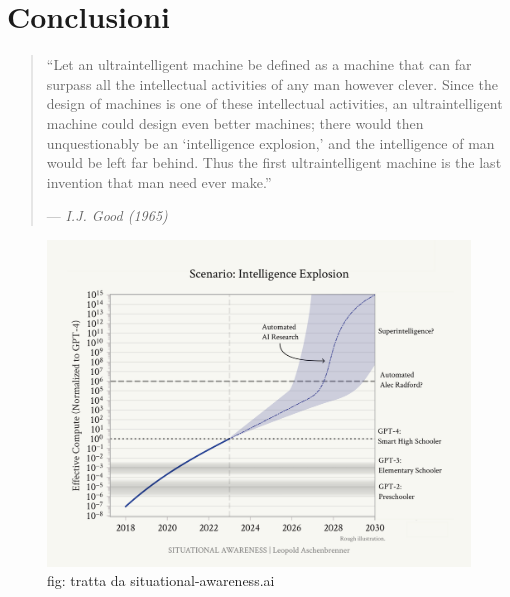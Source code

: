 \documentclass[12pt,a4paper,openright,twoside]{book}
\begin{document}
\chapter{Conclusioni}
\begin{quote}
    “Let an ultraintelligent machine be defined as a machine that can far surpass all the intellectual activities of any man however clever.
    Since the design of machines is one of these intellectual activities, an ultraintelligent machine could design even better machines; there would then unquestionably be an ‘intelligence explosion,’ and the intelligence of man would be left far behind.
    Thus the first ultraintelligent machine is the last invention that man need ever make.”
    
    \hfill--- \textit{I.J. Good (1965)\cite{Good1965}}
\end{quote}
\begin{figure}[h]
    \centering
    \includegraphics[width=\textwidth]{figures/intelligence_explosion.png}
    \caption{fig: tratta da situational-awareness.ai}
\end{figure}
\end{document}
